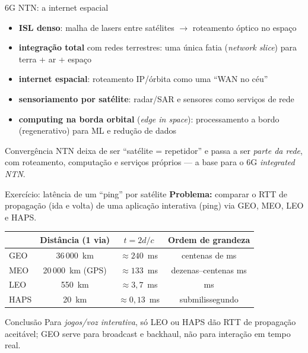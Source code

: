 \documentclass[aspectratio=169,11pt]{beamer}
\begin{document}
\begin{frame}{6G NTN: a internet espacial}
  \begin{itemize}
    \item \textbf{ISL denso}: malha de lasers entre satélites $\rightarrow$ roteamento óptico no espaço
    \item \textbf{integração total} com redes terrestres: uma única fatia (\emph{network slice}) para terra + ar + espaço
    \item \textbf{internet espacial}: roteamento IP/órbita como uma ``WAN no céu''
    \item \textbf{sensoriamento por satélite}: radar/SAR e sensores como serviços de rede
    \item \textbf{computing na borda orbital} (\emph{edge in space}): processamento a bordo (regenerativo) para ML e redução de dados
  \end{itemize}
  \begin{exampleblock}{Convergência}
    NTN deixa de ser ``satélite = repetidor'' e passa a ser \emph{parte da rede}, com roteamento, computação e serviços próprios --- a base para o 6G \emph{integrated NTN}.
  \end{exampleblock}
\end{frame}

\begin{frame}{Exercício: latência de um ``ping'' por satélite}
  \textbf{Problema:} comparar o RTT de propagação (ida e volta) de uma aplicação interativa (ping) via GEO, MEO, LEO e HAPS.
  \begin{center}
    \begin{tabular}{@{}lccc@{}}
      \toprule
      & Distância (1 via) & $t=2d/c$ & Ordem de grandeza\\
      \midrule
      GEO & 36\,000~km & $\approx 240$~ms & centenas de ms \\
      MEO & 20\,000~km (GPS) & $\approx 133$~ms & dezenas--centenas ms \\
      LEO & 550~km & $\approx 3{,}7$~ms & ms \\
      HAPS & 20~km & $\approx 0{,}13$~ms & submilissegundo \\
      \bottomrule
    \end{tabular}
  \end{center}
  \pause
  \begin{alertblock}{Conclusão}
    Para \emph{jogos/voz interativa}, só LEO ou HAPS dão RTT de propagação aceitável; GEO serve para broadcast e backhaul, não para interação em tempo real.
  \end{alertblock}
\end{frame}
\end{document}
